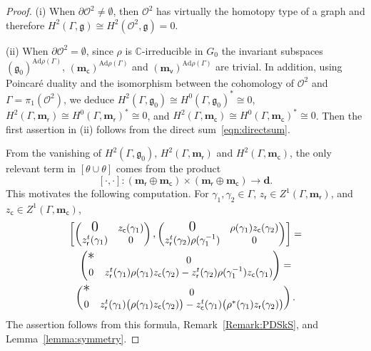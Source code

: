 \documentclass[a4paper,11pt]{article}
\begin{document}
\begin{proof} (i)
When $\partial  \mathcal O^2\neq \emptyset$, then $\mathcal O^2$ has virtually the homotopy type of a graph and therefore
$H^2(\Gamma, \mathfrak g)\cong H^2(\mathcal O^2, \mathfrak g)=0$.

(ii)
When $\partial  \mathcal O^2= \emptyset$, 
since $\rho$ is $\mathbb C$-irreducible in $G_0$ the invariant subspaces 
$
(\mathfrak g_0)^{\mathrm{Ad}\rho(\Gamma)}
$,
$
(\mathbf m_{\mathsf c})^{\mathrm{Ad}\rho(\Gamma)}
$
and
$
(\mathbf m_{\mathsf v})^{\mathrm{Ad}\rho(\Gamma)}
$
are trivial. In addition, using Poincar\' e duality and the isomorphism between the cohomology of $\mathcal O^2$ 
and $\Gamma=\pi_1(\mathcal O^2)$, we deduce 
$H^2(  \Gamma, \mathfrak g_0 )\cong   H^0( \Gamma, \mathfrak g_0)^*\cong 0$, 
$ H^2(\Gamma, \mathbf m_{\mathsf r})\cong  
H^0(\Gamma, \mathbf m_{\mathsf r})^*\cong 0$,
and
$ H^2(\Gamma, \mathbf m_{\mathsf c})\cong  
H^0(\Gamma, \mathbf m_{\mathsf c})^*\cong 0$.
Then the first assertion in (ii) follows from
the direct sum~\eqref{eqn:directsum}. 


From the vanishing of $H^2( \Gamma, \mathfrak g_0 )$,
$ H^2(\Gamma, \mathbf m_{\mathsf r})$
and  $H^2(\Gamma, \mathbf m_{\mathsf c})$, the only relevant term in $ [\theta\cup\theta]$ comes from
the product
$$
[\cdot,\cdot ]\colon (\mathbf m_{\mathsf r}\oplus\mathbf m_{\mathsf c})
\times (\mathbf m_{\mathsf r}\oplus\mathbf m_{\mathsf c})\to \mathbf d.
$$
This motivates the following computation.
For $\gamma_1,\gamma_2\in\Gamma$, 
$z_{\mathsf r}\in Z^1(\Gamma, \mathbf m_{\mathsf r})$,
and $z_{\mathsf c}\in Z^1(\Gamma, \mathbf m_{\mathsf c})$,
\begin{multline*}
\left[
\left(
\begin{matrix}
 \text{\Large 0} & z_{\mathsf c}(\gamma_1) \\
 z_{\mathsf r}^t(\gamma_1) & 0
\end{matrix}
\right)
,
\left(
\begin{matrix}
 \text{\Large 0}  & \rho(\gamma_1)z_{\mathsf c}(\gamma_2) \\
 z_{\mathsf r}^t(\gamma_2)\rho(\gamma_1^{-1}) & 0
\end{matrix}
\right)
\right]=
\\
\left(
\begin{matrix}
 \text{\Large *} & 0 \\
 0 & z_{\mathsf r}^t(\gamma_1)\rho(\gamma_1)z_{\mathsf c}(\gamma_2)-
 z_{\mathsf r}^t(\gamma_2)\rho(\gamma_1^{-1})z_{\mathsf c}(\gamma_1)
\end{matrix}
\right)
=
\\
\left(
\begin{matrix}
 \text{\Large *} & 0 \\
 0 & z_{\mathsf r}^t(\gamma_1)\big(\rho(\gamma_1)z_{\mathsf c}(\gamma_2)\big)-
 z_{\mathsf c}^t(\gamma_1)\big(\rho^*(\gamma_1)z_{\mathsf r}(\gamma_2)\big)
\end{matrix}
\right).
\end{multline*} The assertion follows from this formula, 
Remark~\ref{Remark:PDSkS}, and Lemma~\ref{lemma:symmetry}.
\end{proof}
\end{document}
